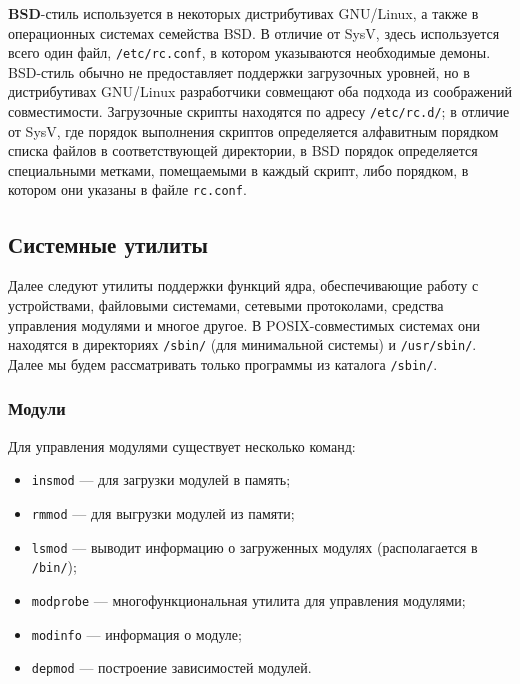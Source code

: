 \textbf{BSD}-стиль используется в некоторых дистрибутивах GNU/Linux, а также в операционных системах семейства BSD. В отличие от SysV, здесь используется всего один файл, \texttt{/etc/rc.conf}, в котором указываются необходимые демоны. BSD-стиль обычно не предоставляет поддержки загрузочных уровней, но в дистрибутивах GNU/Linux разработчики совмещают оба подхода из соображений совместимости.
Загрузочные скрипты находятся по адресу \texttt{/etc/rc.d/}; в отличие от SysV, где порядок выполнения скриптов определяется алфавитным порядком списка файлов в соответствующей директории, в BSD порядок определяется специальными метками, помещаемыми в каждый скрипт, либо порядком, в котором они указаны в файле \texttt{rc.conf}.
 
\subsection{Системные утилиты}\label{base:os:structure:sysutils}
Далее следуют утилиты поддержки функций ядра, обеспечивающие работу с устройствами, файловыми системами, сетевыми протоколами, средства управления модулями и многое другое. В POSIX-совместимых системах они находятся в директориях \texttt{/sbin/} (для минимальной системы) и \texttt{/usr/sbin/}. Далее мы будем рассматривать только программы из каталога \texttt{/sbin/}.

\subsubsection{Модули}\label{base:os:structure:sysutils:modules}
Для управления модулями существует несколько команд:
\begin{itemize}
 \item \texttt{insmod} --- для загрузки модулей в память;
 \item \texttt{rmmod} --- для выгрузки модулей из памяти;
 \item \texttt{lsmod} --- выводит информацию о загруженных модулях (располагается в \texttt{/bin/});
 \item \texttt{modprobe} --- многофункциональная утилита для управления модулями;
 \item \texttt{modinfo} --- информация о модуле;
 \item \texttt{depmod} --- построение зависимостей модулей.
\end{itemize}

